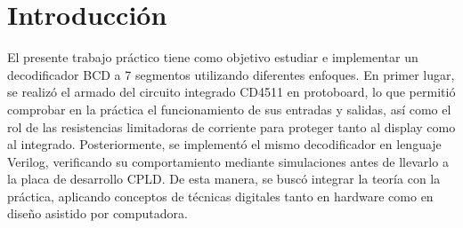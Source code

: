 \chapter{Introducción}
El presente trabajo práctico tiene como objetivo estudiar e implementar un decodificador BCD a 7 segmentos utilizando
diferentes enfoques. En primer lugar, se realizó el armado del circuito integrado CD4511 en protoboard, lo que permitió
comprobar en la práctica el funcionamiento de sus entradas y salidas, así como el rol de las resistencias limitadoras de
corriente para proteger tanto al display como al integrado. Posteriormente, se implementó el mismo decodificador en
lenguaje Verilog, verificando su comportamiento mediante simulaciones antes de llevarlo a la placa de desarrollo CPLD. De
esta manera, se buscó integrar la teoría con la práctica, aplicando conceptos de técnicas digitales tanto en hardware
como en diseño asistido por computadora.
